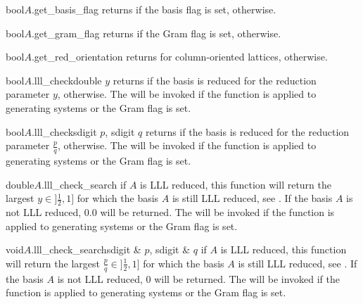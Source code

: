 \begin{fcode}{bool}{$A$.get_basis_flag}{}
  returns \TRUE if the basis flag is set, \FALSE otherwise.
\end{fcode}

\begin{fcode}{bool}{$A$.get_gram_flag}{}
  returns \TRUE if the Gram flag is set, \FALSE otherwise.
\end{fcode}

\begin{fcode}{bool}{$A$.get_red_orientation}{}
  returns \TRUE for column-oriented lattices, \FALSE otherwise.
\end{fcode}

\begin{fcode}{bool}{$A$.lll_check}{double $y$}
  returns \TRUE if the basis is reduced for the reduction parameter $y$, \FALSE otherwise.  The
  \LEH will be invoked if the function is applied to generating systems or the Gram flag is set.
\end{fcode}

\begin{fcode}{bool}{$A$.lll_check}{sdigit $p$, sdigit $q$}
  returns \TRUE if the basis is reduced for the reduction parameter $\frac{p}{q}$, \FALSE
  otherwise.  The \LEH will be invoked if the function is applied to generating systems or the
  Gram flag is set.
\end{fcode}

\begin{fcode}{double}{$A$.lll_check_search}{}
  if $A$ is LLL reduced, this function will return the largest $y\in ]\frac{1}{2},1]$ for which
  the basis $A$ is still LLL reduced, see
  \cite{LenstraAK/LenstraHW/Lovasz:1982,Schnorr/Euchner:1994}.  If the basis $A$ is not LLL
  reduced, $0.0$ will be returned.  The \LEH will be invoked if the function is applied to
  generating systems or the Gram flag is set.
\end{fcode}

\begin{fcode}{void}{$A$.lll_check_search}{sdigit & $p$, sdigit & $q$}
  if $A$ is LLL reduced, this function will return the largest $\frac{p}{q}\in ]\frac{1}{2},1]$
  for which the basis $A$ is still LLL reduced, see \cite{LenstraAK/LenstraHW/Lovasz:1982,
    Schnorr/Euchner:1994}.  If the basis $A$ is not LLL reduced, 0 will be returned.  The \LEH
  will be invoked if the function is applied to generating systems or the Gram flag is set.
\end{fcode}


